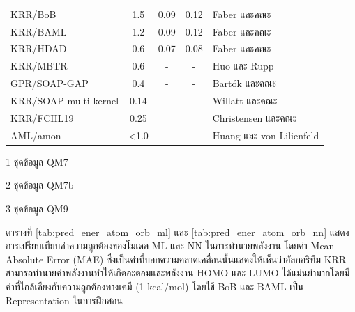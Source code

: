 \begin{table}[H]
\begin{threeparttable}[b]
\begin{tabular}{lcccl}
            KRR/BoB\tnote{3}                 & 1.5              & 0.09 & 0.12 & Faber และคณะ\autocite{faber2017}             \\
            KRR/BAML\tnote{3}                & 1.2              & 0.09 & 0.12 & Faber และคณะ\autocite{faber2017}             \\
            KRR/HDAD\tnote{3}                & 0.6              & 0.07 & 0.08 & Faber และคณะ\autocite{faber2017}             \\
            KRR/MBTR\tnote{2}                & 0.6              & -    & -    & Huo และ Rupp\autocite{huo2022}               \\
            GPR/SOAP-GAP\tnote{2}            & 0.4              & -    & -    & Bart\'{o}k และคณะ\autocite{bartok2017}       \\
            KRR/SOAP multi-kernel\tnote{3}   & 0.14             & -    & -    & Willatt และคณะ\autocite{willatt2018}         \\
            KRR/FCHL19\tnote{3}              & 0.25             &      &      & Christensen และคณะ\autocite{christensen2020} \\
            AML/amon\tnote{3}                & <1.0             &      &      & Huang และ von Lilienfeld\autocite{huang2020} \\
            \bottomrule
        \end{tabular}
        \begin{tablenotes}
            \item [1]ชุดข้อมูล QM7
            \item [2]ชุดข้อมูล QM7b
            \item [3]ชุดข้อมูล QM9
        \end{tablenotes}
    \end{threeparttable}
\end{table}

ตารางที่ \ref{tab:pred_ener_atom_orb_ml} และ \ref{tab:pred_ener_atom_orb_nn} แสดงการเปรียบเทียบค่าความถูกต้องของโมเดล ML และ NN ในการทำนายพลังงาน โดยค่า Mean Absolute Error (MAE) ซึ่งเป็นค่าที่บอกความคลาดเคลื่อนนั้นแสดงให้เห็นว่าอัลกอริทึม KRR สามารถทำนายค่าพลังงานทำให้เกิดอะตอมและพลังงาน HOMO และ LUMO ได้แม่นยำมากโดยมีค่าที่ใกล้เคียงกับความถูกต้องทางเคมี (1 kcal/mol) โดยใช้ BoB\autocite{huang2016} และ BAML\autocite{faber2017} เป็น Representation ในการฝึกสอน

